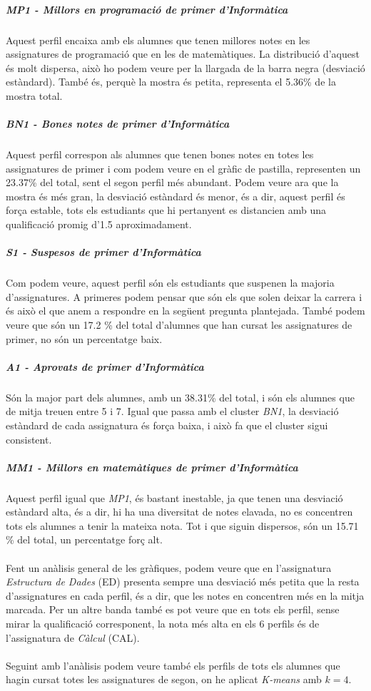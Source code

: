 \documentclass[12pt,a4paper,catalan]{article}
\begin{document}
\subparagraph{MP1 - Millors en programació de primer d'Informàtica} 
Aquest perfil encaixa amb els alumnes que tenen millores notes en les assignatures de programació que en les de matemàtiques. La distribució d'aquest és molt dispersa, això ho podem veure per la llargada de la barra negra (desviació estàndard). També és, perquè la mostra és petita, representa el 5.36\% de la mostra total.

\subparagraph{BN1 - Bones notes de primer d'Informàtica}
Aquest perfil correspon als alumnes que tenen bones notes en totes les assignatures de primer i com podem veure en el gràfic de pastilla, representen un 23.37\% del total, sent el segon perfil més abundant. Podem veure ara que la mostra és més gran, la desviació estàndard és menor, és a dir, aquest perfil és força estable, tots els estudiants que hi pertanyent es distancien amb una qualificació promig d'1.5 aproximadament.

\subparagraph{S1 - Suspesos de primer d'Informàtica}
Com podem veure, aquest perfil són els estudiants que suspenen la majoria d'assignatures. A primeres podem pensar que són els que solen deixar la carrera i és això el que anem a respondre en la següent pregunta plantejada. També podem veure que són un 17.2 \% del total d'alumnes que han cursat les assignatures de primer, no són un percentatge baix.

\subparagraph{A1 - Aprovats de primer d'Informàtica}
Són la major part dels alumnes, amb un 38.31\% del total, i són els alumnes que de mitja treuen entre 5 i 7. Igual que passa amb el cluster \textit{BN1}, la desviació estàndard de cada assignatura és força baixa, i això fa que el cluster sigui consistent.

\subparagraph{MM1 - Millors en matemàtiques de primer d'Informàtica}
Aquest perfil igual que \textit{MP1}, és bastant inestable, ja que tenen una desviació estàndard alta, és a dir, hi ha una diversitat de notes elavada, no es concentren tots els alumnes a tenir la mateixa nota. Tot i que siguin dispersos, són un 15.71 \% del total, un percentatge forç alt.
\\
\\
Fent un anàlisis general de les gràfiques, podem veure que en l'assignatura \textit{Estructura de Dades} (ED) presenta sempre una desviació més petita que la resta d'assignatures en cada perfil, és a dir, que les notes en concentren més en la mitja marcada. Per un altre banda també es pot veure que en tots els perfil, sense mirar la qualificació corresponent, la nota més alta en els 6 perfils és de l'assignatura de \textit{Càlcul} (CAL).
\\
\\
Seguint amb l'anàlisis podem veure també els perfils de tots els alumnes que hagin cursat totes les assignatures de segon, on he aplicat \textit{K-means} amb $k=4$.
\end{document}
